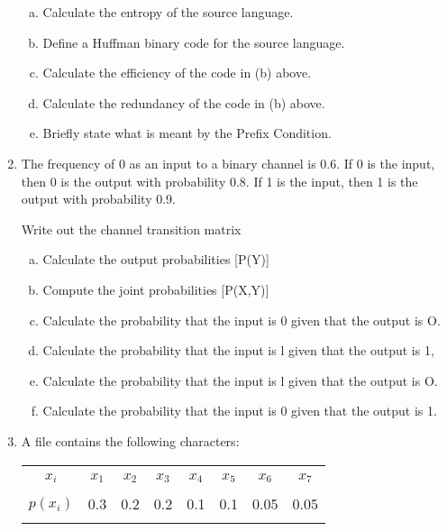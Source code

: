 \documentclass[a4paper,12pt]{article}
\begin{document}
\begin{enumerate}
\begin{enumerate}[(a)]
	\item Calculate the entropy of the source language.
	\item Define a Huffman binary code for the source language.
	\item Calculate the efficiency of the code in (b) above.
	\item Calculate the redundancy of the code in (b) above.
	\item Briefly state what is meant by the Prefix Condition.
\end{enumerate}

\item The frequency of 0 as an input to a binary channel is 0.6. If 0 is the input, then 0 is the output with probability 0.8. If 1 is the input, then 1 is the output with probability 0.9.

Write out the channel transition matrix

\begin{enumerate}[(a)]
\item	Calculate the output probabilities [P(Y)] 
\item	Compute the joint probabilities [P(X,Y)]
\item	Calculate the probability that the input is 0 given that the output is O. 
\item Calculate the probability that the input is l given that the output is 1, 
\item	Calculate the probability that the input is l given that the output is O.
\item	Calculate the probability that the input is 0 given that the output is 1. 
\end{enumerate}


  \item A file contains the following characters:
\begin{center}
	\begin{tabular}{|c|ccccccc|}
		\hline
		&&&&&&& \\[-0.4cm]
		$x_i$     & $x_1$ & $x_2$ & $x_3$ & $x_4$ & $x_5$ & $x_6$ & $x_7$ \\[0.1cm]
		\hline
		&&&&&&& \\[-0.4cm]
		$p(x_i)$  & 0.3 & 0.2 & 0.2 & 0.1 & 0.1 & 0.05 & 0.05 \\[0.1cm]
		\hline
		\multicolumn{7}{c}{}\\[-0.2cm]
	\end{tabular}
\end{center}


\end{enumerate}
\end{document}
